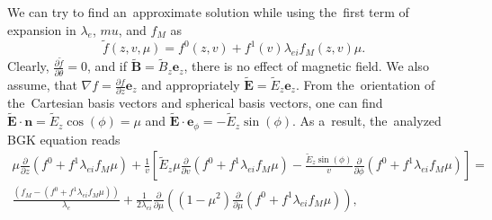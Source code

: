 \documentclass[review]{elsarticle}
\newcommand{\pdv}[2]{\frac{\partial{#1}}{\partial{#2}}}
\newcommand{\vect}[1]{\boldsymbol{#1}}
\newcommand{\mfpe}{\lambda_e}
\newcommand{\mfpei}{\lambda_{ei}}
\newcommand{\vmag}{v}
\newcommand{\vn}{\vect{n}}
\newcommand{\tE}{\vect{\tilde{E}}}
\newcommand{\tB}{\vect{\tilde{B}}}
\newcommand{\fM}{f_M}
\begin{document}
We can try to find an~approximate solution while using the~first term of
expansion in $\mfpe$, $mu$, and $\fM$ as
\begin{equation}
  \tilde{f}(z, \vmag, \mu) = f^0(z, \vmag) + f^1(\vmag) \mfpei\fM(z, \vmag)\mu .
  \label{eq:f_approximation}
\end{equation}
Clearly, $\pdv{\tilde{f}}{\theta} = 0$, and if $\tB = \tilde{B}_z\vect{e}_z$, 
there is no effect of magnetic field. We also assume, that 
$\nabla f = \pdv{f}{z}\vect{e}_z$ and appropriately 
$\tE = \tilde{E}_z\vect{e}_z$.
From the~orientation of the~Cartesian basis vectors and spherical 
basis vectors, one can find $\tE\cdot\vn = \tilde{E}_z \cos(\phi) = \mu$ and
$\tE\cdot\vect{e}_\phi = -\tilde{E}_z\sin(\phi)$. As a~result, the~analyzed
BGK equation reads
\begin{multline}
  \mu\pdv{}{z}\left( f^0 + f^1 \mfpei\fM\mu \right) 
  + \frac{1}{\vmag} \left[ \tilde{E}_z\mu \pdv{}{\vmag} 
  \left( f^0 + f^1 \mfpei\fM\mu \right) 
  - \frac{\tilde{E}_z\sin(\phi)}{\vmag}\pdv{}{\phi} 
  \left( f^0 + f^1 \mfpei\fM\mu \right)
  \right] 
  =\\
  \frac{\left(\fM - \left( f^0 + f^1 \mfpei\fM\mu \right) \right)}{\mfpe} 
  + \frac{1}{2 \mfpei}\pdv{}{\mu}\left((1 - \mu^2)
  \pdv{}{\mu}\left( f^0 + f^1 \mfpei\fM\mu \right) \right) ,
  \label{eq:BGK_spherical}
\end{multline}
\end{document}

